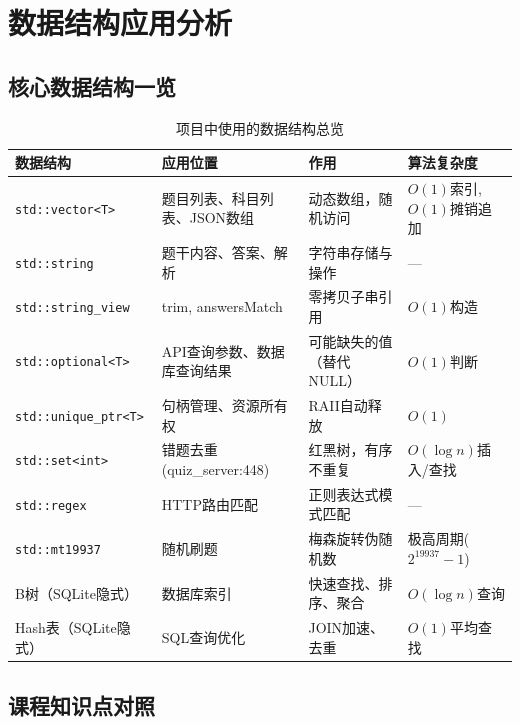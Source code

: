\documentclass[12pt,a4paper]{ctexart}
\begin{document}
\newpage

\section{数据结构应用分析}

\subsection{核心数据结构一览}

\begin{table}[h]
\centering
\begin{tabular}{|l|l|l|l|}
\hline
\textbf{数据结构}     & \textbf{应用位置}              & \textbf{作用}                  & \textbf{算法复杂度} \\ \hline
\texttt{std::vector<T>}   & 题目列表、科目列表、JSON数组   & 动态数组，随机访问      & $O(1)$索引, $O(1)$摊销追加 \\ \hline
\texttt{std::string}      & 题干内容、答案、解析           & 字符串存储与操作        & — \\ \hline
\texttt{std::string\_view} & trim, answersMatch            & 零拷贝子串引用          & $O(1)$构造 \\ \hline
\texttt{std::optional<T>} & API查询参数、数据库查询结果    & 可能缺失的值（替代NULL） & $O(1)$判断 \\ \hline
\texttt{std::unique\_ptr<T>} & 句柄管理、资源所有权          & RAII自动释放            & $O(1)$ \\ \hline
\texttt{std::set<int>}    & 错题去重 (quiz\_server:448)    & 红黑树，有序不重复      & $O(\log n)$插入/查找 \\ \hline
\texttt{std::regex}       & HTTP路由匹配                  & 正则表达式模式匹配      & — \\ \hline
\texttt{std::mt19937}     & 随机刷题                      & 梅森旋转伪随机数        & 极高周期($2^{19937}-1$) \\ \hline
B树（SQLite隐式）   & 数据库索引                    & 快速查找、排序、聚合    & $O(\log n)$查询 \\ \hline
Hash表（SQLite隐式）& SQL查询优化                   & JOIN加速、去重          & $O(1)$平均查找 \\ \hline
\end{tabular}
\caption{项目中使用的数据结构总览}
\end{table}

\subsection{课程知识点对照}
\end{document}

